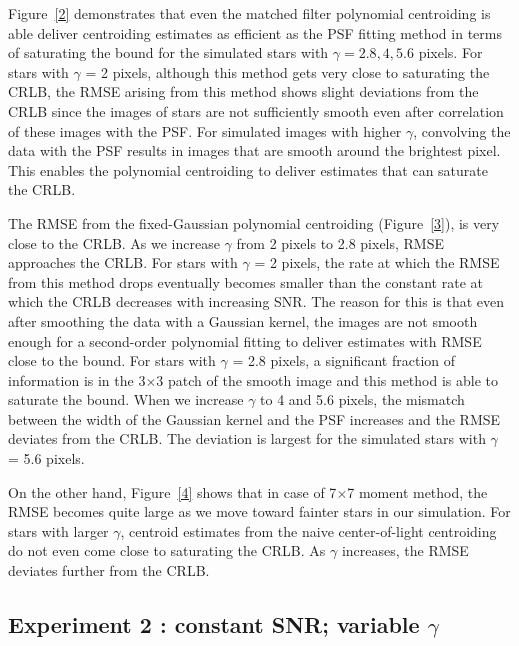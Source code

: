 Figure~\ref{2} demonstrates that even the matched filter polynomial 
centroiding is able deliver centroiding estimates as efficient as the PSF fitting method in terms of saturating the bound for the simulated stars with $\gamma = 2.8, 4, 5.6$ pixels. For stars with $\gamma$ = 2 pixels, although this method gets very close to saturating the CRLB, the RMSE arising from this method shows slight deviations from the CRLB since the images of stars are not sufficiently smooth even after correlation of these images with the PSF. For simulated images with higher $\gamma$, convolving the data with the PSF results in images that are smooth around the brightest pixel. This enables the polynomial centroiding to deliver estimates that can saturate the CRLB.

The RMSE from the fixed-Gaussian polynomial centroiding (Figure~\ref{3}),
is very close to the CRLB. As we increase $\gamma$ from 2 pixels to 2.8 pixels, RMSE approaches the CRLB. For stars with $\gamma$ = 2 pixels, the rate at which the RMSE from this method drops
eventually becomes smaller than the constant rate at which the CRLB
decreases with increasing SNR. The reason for this is that even after smoothing
the data with a Gaussian kernel, the images are not smooth enough
for a second-order polynomial fitting to deliver estimates with RMSE close to the bound. For stars with $\gamma$ = 2.8 pixels, a significant fraction of information is in the 3$\times$3 patch of the smooth image and this method is able to saturate the bound. When we increase $\gamma$ to 4 and 5.6 pixels, the mismatch between the width of the Gaussian kernel and the PSF increases and the RMSE deviates from the CRLB. The deviation is largest for the simulated stars with $\gamma$ = 5.6 pixels.

On the other hand, Figure~\ref{4} shows that in case of 7$\times$7 moment method, the RMSE becomes quite large as we move toward fainter stars in our simulation.
For stars with larger $\gamma$, centroid estimates from the naive center-of-light 
centroiding do not even come close to saturating the CRLB. As $\gamma$ increases, the 
RMSE deviates further from the CRLB. 

\subsection{Experiment 2 : constant SNR; variable $\gamma$}

